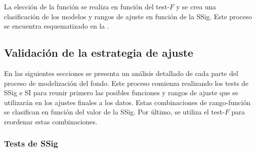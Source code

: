 La elección de la función se realiza en función del test-\(F\) y se crea una clasificación de los modelos y rangos de ajuste en función de la \ac{SSig}. Este proceso se encuentra esquematizado en la \Fig{\ref{fig:bkg:modeling:strategy:validation:function_selection}}.







































\subsection{Validación de la estrategia de ajuste}
\label{subsec:bkg:modeling:sigbkg}

En las siguientes secciones se presenta un análisis detallado de cada parte del proceso de modelización del fondo. Este proceso comienza realizando los tests de \ac{SSig} e \ac{SI} para reunir primero las posibles funciones y rangos de ajuste que se utilizarán en los ajustes finales a los datos. Estas combinaciones de rango-función se clasifican en función del valor de la \ac{SSig}. Por último, se utiliza el test-\(F\) para reordenar estas combinaciones.


\subsubsection{Tests de \acl{SSig}}
\label{subsubsec:bkg:modeling:sigbkg:sstest}

